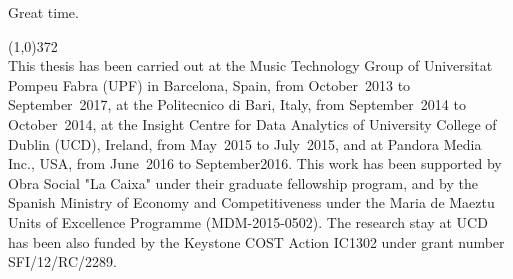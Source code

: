 Great time.


\vspace*{\fill}

\line(1,0){372}\\
\footnotesize
This thesis has been carried out at the Music Technology Group of Universitat Pompeu Fabra (UPF) in Barcelona, Spain, from October~2013 to September~2017, at the Politecnico di Bari, Italy, from September~2014 to October~2014, at the Insight Centre for Data Analytics of University College of Dublin (UCD), Ireland, from May~2015 to July~2015, and at Pandora Media Inc., USA, from June~2016 to September2016. This work has been supported by Obra Social "La Caixa" under their graduate fellowship program, and by the Spanish Ministry of Economy and Competitiveness under the Maria de Maeztu Units of Excellence Programme (MDM-2015-0502). The research stay at UCD has been also funded by the Keystone COST Action IC1302 under grant number SFI/12/RC/2289.
\normalsize